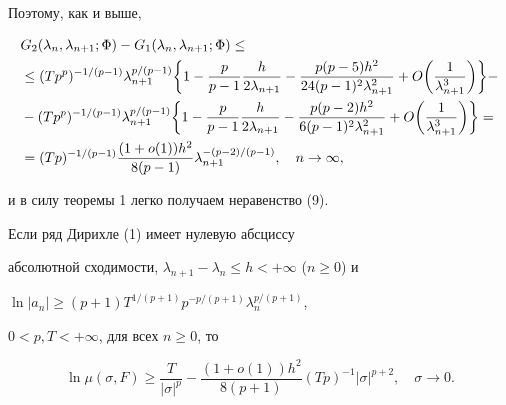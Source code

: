 Поэтому, как и выше,


\begin{align}




&G_2(\lambda_n,\lambda_{n+1};\Phi)-


G_1(\lambda_n,\lambda_{n+1};\Phi)\le\notag\\


&\le (Tp^p)^{-1/(p-1)}\lambda_{n+1}^{p/(p-1)}


\bigg\{1-\frac{p}{p-1}\frac{h}{2\lambda_{n+1}}-


\frac{p(p-5)h^2}{24(p-1)^2\lambda^2_{n+1}}


+O\bigg(\frac{1}{\lambda_{n+1}^3}\bigg)\bigg\}-\notag\\


&-(Tp^p)^{-1/(p-1)}\lambda_{n+1}^{p/(p-1)}


\bigg\{1-\frac{p}{p-1}\frac{h}{2\lambda_{n+1}}-


\frac{p(p-2)h^2}{6(p-1)^2\lambda^2_{n+1}}


+O\bigg(\frac{1}{\lambda_{n+1}^3}\bigg)\bigg\}=\notag\\


&=(Tp)^{-1/(p-1)}\frac{(1+o(1))h^2}{8(p-1)}\lambda^{-(p-2)/(p-1)}_{n+1},


\quad n\to\infty,


\end{align}


и в силу теоремы 1 легко получаем неравенство (9).





\begin{cor} Если ряд Дирихле (1) имеет нулевую абсциссу


абсолютной сходимости, $\lambda_{n+1}-\lambda_n\le h<+\infty$ ($n\ge 0$) и


$\ln |a_n|\ge(p+1)T^{1/(p+1)}p^{-p/(p+1)}\lambda_n^{p/(p+1)}$,


$0<p,T<+\infty$, для всех $n\ge 0$, то 


\begin{equation}


\ln\mu(\sigma,F)\ge \frac{T}{|\sigma|^p}-


\frac{(1+o(1))h^2}{8(p+1)}(Tp)^{-1}|\sigma|^{p+2},\quad \sigma\to 0.


\end{equation}


\end{cor}





